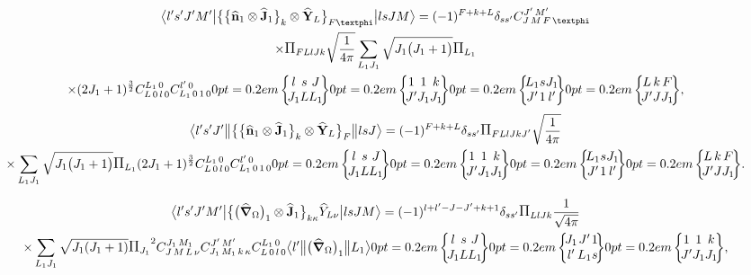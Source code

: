 \begin{multline}
\braOket{ l^{\prime} s^{\prime} J^{\prime} M^{\prime}}{\bigl\{\bigl\{\widehat{\vect{n}}_{1} \otimes \widehat{\vect{J}}_{1}\bigr\}_{k} \otimes \widehat{\vect{Y}}_{L}\bigr\}_{F \varphi}}{l s J M}=(-1)^{F+k+L} \delta_{s s^{\prime}}
\clebsch{J}{M}{F}{\varphi}{J^{\prime}}{M^{\prime}} \\
 \times \Fact{F L l J k}\sqrt{\frac{1}{4 \pi}} \sum_{L_{1} J_{1}} \sqrt{J_{1}\bigl(J_{1}+1\bigr)}\Fact{L_{1}} \\
 \times(2 J_{1}+1)^{\frac{3}{2}}
\clebsch{L}{0}{l}{0}{L_{1}}{0}
\clebsch{L_{1}}{0}{1}{0}{l^{\prime}}{0}
\sixj{l}{s}{J}{J_{1}}{L}{L_{1}}
\sixj{1}{1}{k}{J^{\prime}}{J_{1}}{J_{1}}
\sixj{L_{1}}{s}{J_{1}}{J^{\prime}}{1}{l^{\prime}}
\sixj{L}{k}{F}{J^{\prime}}{J}{J_{1}}, \label{eq:13:2:139}
\end{multline}
\begin{multline*}
\braOketred{ l^{\prime} s^{\prime} J^{\prime}}{\bigl\{\bigl\{\widehat{\vect{n}}_{1} \otimes \widehat{\vect{J}}_{1}\bigr\}_{k} \otimes \widehat{\vect{Y}}_{L}\bigr\}_{F}}{l s J}=(-1)^{F+k+L} \delta_{s s^{\prime}}
\Fact{F L l J k J^{\prime}}\sqrt{\frac{1}{4 \pi}} \\
\times \sum_{L_{1} J_{1}} \sqrt{J_{1}\bigl(J_{1}+1\bigr)}\Fact{L_{1}}(2 J_{1}+1)^{\frac{3}{2}}
\clebsch{L}{0}{l}{0}{L_{1}}{0}
\clebsch{L_{1}}{0}{1}{0}{l^{\prime}}{0}
\sixj{l}{s}{J}{J_{1}}{L}{L_{1}}
\sixj{1}{1}{k}{J^{\prime}}{J_{1}}{J_{1}}
\sixj{L_{1}}{s}{J_{1}}{J^{\prime}}{1}{l^{\prime}}
\sixj{L}{k}{F}{J^{\prime}}{J}{J_{1}}.
\end{multline*}

\begin{multline}
\braOket{ l^{\prime} s^{\prime} J^{\prime} M^{\prime}}{\bigl\{\bigl(\delop_{\Omega}\bigr)_{1} \otimes \widehat{\vect{J}}_{1}\bigr\}_{k\kappa} \widehat{Y}_{L\nu}}{l s J M}=(-1)^{l+l^{\prime}-J-J^{\prime}+k+1}\delta_{ss'} \Fact{L l J k}\frac{1}{\sqrt{4\pi}}
\\
\times
 \sum_{L_{1} J_{1}} \sqrt{J_{1}(J_{1}+1)}\Fact{J_{1}}^2 
 \clebsch{J}{M}{L}{\nu}{J_1}{M_1}
 \clebsch{J_1}{M_1}{k}{\kappa}{J'}{M'}
\clebsch{L}{0}{l}{0}{L_{1}}{0}
\braOketred{l^{\prime}}{\bigl(\delop_{\Omega}\bigr)_{1}}{ L_{1}}
\sixj{l}{s}{J}{J_{1}}{L}{L_{1}}
\sixj{J_{1}}{J^{\prime}}{1}{l^{\prime}}{L_{1}}{s}
\sixj{1}{1}{k}{J^{\prime}}{J_{1}}{J_{1}},  \label{eq:13:2:140}
\end{multline}

